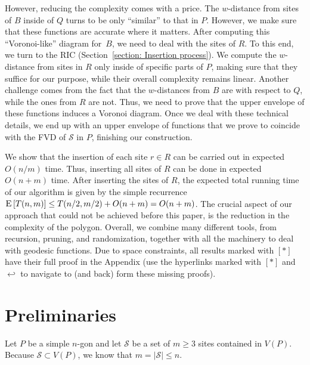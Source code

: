 \documentclass[a4paper,UKenglish]{socg-lipics-v2018}
\newcommand{\s}{\mathcal S}
\newcommand{\ex}[1]{\textsc{E}\left[#1\right]}
\begin{document}
However, reducing the complexity comes with a price. The $w$-distance from sites  of $B$ inside of $Q$ turns to be only ``similar'' to that in $P$.
However, we make sure that these functions are accurate where it matters. 
After computing this ``Voronoi-like'' diagram for~$B$, we need to deal with the sites of $R$. 
To this end, we turn to the RIC (Section~\ref{section: Insertion process}).
We compute the $w$-distance from sites in $R$ only inside of specific parts of $P$, making sure that they suffice for our purpose, while their overall complexity remains linear.
Another challenge comes from the fact that the $w$-distances from $B$ are with respect to $Q$, while the ones from $R$ are not.
Thus, we need to prove that the upper envelope of these functions induces a Voronoi diagram.
Once we deal with these technical details, we end up with an upper envelope of functions that we prove to coincide with the FVD of $\s$ in $P$, finishing our construction. 

We show that the insertion of each site $r\in R$ can be carried out in expected $O(n/m)$ time.  
Thus, inserting all sites of $R$ can be done in expected $O(n+ m)$ time.
After inserting the sites of $R$, the expected total running time of our algorithm is given by the simple recurrence $\ex{T(n, m)} \leq T(n/2, m/2) + O(n+m) = O(n+ m)$.
The crucial aspect of our approach that could not be achieved before this paper, is the reduction in the complexity of the polygon. 
Overall, we combine many different tools, from recursion, pruning, and randomization, together with all the machinery to deal with geodesic functions. 
Due to space constraints, all results marked with $[*]$ have their full proof in the Appendix (use the hyperlinks marked with $[*]$ and $\hookleftarrow$ to navigate to (and back) form these missing proofs).

\section{Preliminaries}

Let $P$ be a simple $n$-gon and  let $\s$ be a set of $m\geq 3$ sites contained in $V(P)$. 
Because $\s\subset V(P)$, we know that $m = |\s|\leq  n$.
\end{document}
